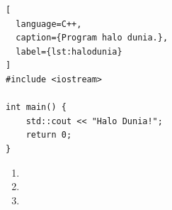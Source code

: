 \begin{lstlisting}[
  language=C++,
  caption={Program halo dunia.},
  label={lst:halodunia}
]
#include <iostream>

int main() {
    std::cout << "Halo Dunia!";
    return 0;
}
\end{lstlisting}

\lipsum[12]

\begin{enumerate}
  \item \lipsum[13][1-4]
  \item \lipsum[13][5-8]
  \item \lipsum[13][9-12]
\end{enumerate}

\lipsum[14-15]